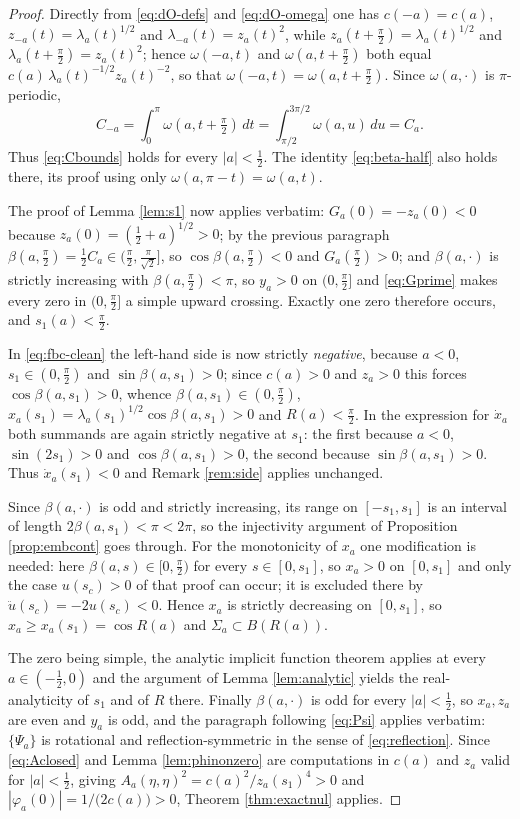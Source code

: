 \documentclass[10pt,a4paper]{amsart}
\begin{document}
\begin{proof}
Directly from \eqref{eq:dO-defs} and \eqref{eq:dO-omega} one has $c(-a)=c(a)$, $z_{-a}(t)=\lambda_a(t)^{1/2}$ and $\lambda_{-a}(t)=z_a(t)^2$, while $z_a(t+\tfrac\pi2)=\lambda_a(t)^{1/2}$ and $\lambda_a(t+\tfrac\pi2)=z_a(t)^2$; hence $\omega(-a,t)$ and $\omega(a,t+\tfrac\pi2)$ both equal $c(a)\,\lambda_a(t)^{-1/2}z_a(t)^{-2}$, so that
$\omega(-a,t)=\omega(a,t+\tfrac\pi2)$. Since $\omega(a,\cdot)$ is $\pi$-periodic,
\[
C_{-a}=\int_0^{\pi}\omega(a,t+\tfrac\pi2)\,dt
=\int_{\pi/2}^{3\pi/2}\omega(a,u)\,du=C_a.
\]
Thus \eqref{eq:Cbounds} holds for every $|a|<\tfrac12$. The identity \eqref{eq:beta-half} also holds there, its proof using only $\omega(a,\pi-t)=\omega(a,t)$.

The proof of Lemma \ref{lem:s1} now applies verbatim: $G_a(0)=-z_a(0)<0$ because $z_a(0)=(\tfrac12+a)^{1/2}>0$; by the previous paragraph $\beta(a,\tfrac\pi2)=\tfrac12C_a\in(\tfrac\pi2,\tfrac{\pi}{\sqrt2}]$, so $\cos\beta(a,\tfrac\pi2)<0$ and $G_a(\tfrac\pi2)>0$; and $\beta(a,\cdot)$ is
strictly increasing with $\beta(a,\tfrac\pi2)<\pi$, so $y_a>0$ on $(0,\tfrac\pi2]$ and \eqref{eq:Gprime} makes every zero in $(0,\tfrac\pi2]$ a simple upward crossing. Exactly one zero therefore occurs, and $s_1(a)<\tfrac\pi2$.

In \eqref{eq:fbc-clean} the left-hand side is now strictly \emph{negative}, because $a<0$, $s_1\in(0,\tfrac\pi2)$ and $\sin\beta(a,s_1)>0$; since $c(a)>0$ and $z_a>0$ this forces $\cos\beta(a,s_1)>0$, whence $\beta(a,s_1)\in(0,\tfrac\pi2)$,
$x_a(s_1)=\lambda_a(s_1)^{1/2}\cos\beta(a,s_1)>0$ and $R(a)<\tfrac\pi2$. In the expression for $\dot x_a$ both summands are again strictly negative at $s_1$: the first because $a<0$, $\sin(2s_1)>0$ and $\cos\beta(a,s_1)>0$, the second
because $\sin\beta(a,s_1)>0$. Thus $\dot x_a(s_1)<0$ and
Remark \ref{rem:side} applies unchanged.

Since $\beta(a,\cdot)$ is odd and strictly increasing, its range on $[-s_1,s_1]$ is an interval of length $2\beta(a,s_1)<\pi<2\pi$, so the injectivity argument of Proposition \ref{prop:embcont} goes through. For the
monotonicity of $x_a$ one modification is needed: here
$\beta(a,s)\in[0,\tfrac\pi2)$ for every $s\in[0,s_1]$, so $x_a>0$ on $[0,s_1]$ and only the case $u(s_c)>0$ of that proof can occur; it is excluded there by $\ddot u(s_c)=-2u(s_c)<0$. Hence $x_a$ is strictly decreasing on $[0,s_1]$, so $x_a\geq x_a(s_1)=\cos R(a)$ and $\Sigma_a\subset B(R(a))$.

The zero being simple, the analytic implicit function theorem applies at every $a\in(-\tfrac12,0)$ and the argument of Lemma \ref{lem:analytic} yields the real-analyticity of $s_1$ and of $R$ there. Finally $\beta(a,\cdot)$ is odd for
every $|a|<\tfrac12$, so $x_a,z_a$ are even and $y_a$ is odd, and the paragraph following \eqref{eq:Psi} applies verbatim: $\{\Psi_a\}$ is rotational and reflection-symmetric in the sense of \eqref{eq:reflection}. Since \eqref{eq:Aclosed} and Lemma \ref{lem:phinonzero} are computations in $c(a)$
and $z_a$ valid for $|a|<\tfrac12$, giving $A_a(\eta,\eta)^2=c(a)^2/z_a(s_1)^4>0$
and $|\varphi_a(0)|=1/\bigl(2c(a)\bigr)>0$, Theorem \ref{thm:exactnul} applies.
\end{proof}
\end{document}
